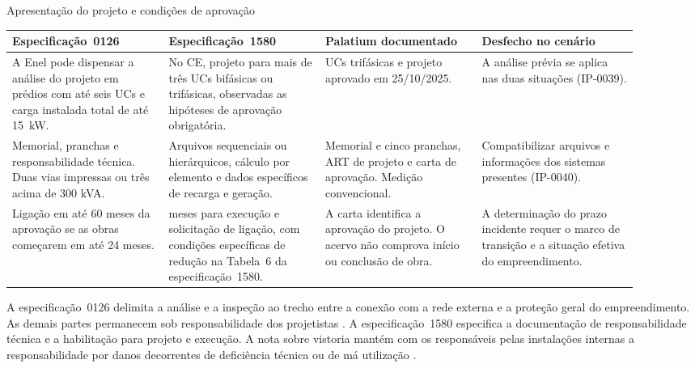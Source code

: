 \begin{quadro}[!htbp]
\centering
\caption{Apresentação do projeto e condições de aprovação}\label{qua:documentacao-aprovacao}
{\small\setlength{\tabcolsep}{3pt}\renewcommand{\arraystretch}{1.14}
\begin{tabular}{|*{4}{>{\raggedright\arraybackslash}p{0.225\linewidth}|}}\hline
\textbf{Especificação~0126} & \textbf{Especificação~1580} & \textbf{Palatium documentado} & \textbf{Desfecho no cenário} \\\hline
A Enel pode dispensar a análise do projeto em prédios com até seis UCs e carga instalada total de até 15~kW. & No CE, projeto para mais de três UCs bifásicas ou trifásicas, observadas as hipóteses de aprovação obrigatória. & 28 UCs trifásicas e projeto aprovado em 25/10/2025. & A análise prévia se aplica nas duas situações (IP-0039). \\\hline
Memorial, pranchas e responsabilidade técnica. Duas vias impressas ou três acima de 300 kVA. & Arquivos sequenciais ou hierárquicos, cálculo por elemento e dados específicos de recarga e geração. & Memorial e cinco pranchas, ART de projeto e carta de aprovação. Medição convencional. & Compatibilizar arquivos e informações dos sistemas presentes (IP-0040). \\\hline
Ligação em até 60 meses da aprovação se as obras começarem em até 24 meses. & 36 meses para execução e solicitação de ligação, com condições específicas de redução na Tabela~6 da especificação~1580. & A carta identifica a aprovação do projeto. O acervo não comprova início ou conclusão de obra. & A determinação do prazo incidente requer o marco de transição e a situação efetiva do empreendimento. \\\hline
\end{tabular}}
\end{quadro}

A especificação~0126 delimita a análise e a inspeção ao trecho entre a conexão com a rede externa e a proteção geral do empreendimento. As demais partes permanecem sob responsabilidade dos projetistas \cite[itens~7.12.1.4 e~7.12.1.5]{enel0126}. A especificação~1580 especifica a documentação de responsabilidade técnica e a habilitação para projeto e execução. A nota sobre vistoria mantém com os responsáveis pelas instalações internas a responsabilidade por danos decorrentes de deficiência técnica ou de má utilização \cite[itens~7.2, 7.3, 7.3.2, alínea~a, e~7.6]{enel1580}.

